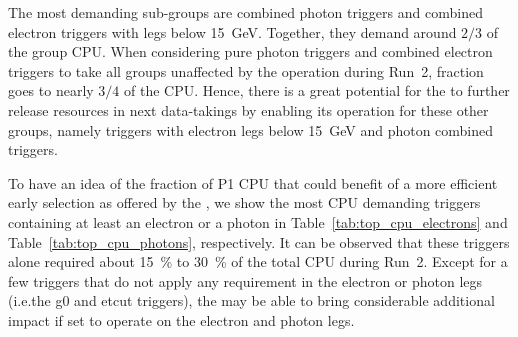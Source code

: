 The most demanding \egamma{} sub-groups are combined photon triggers and
combined electron triggers with legs below \SI{15}{\GeV}. Together, they demand
around $2/3$ of the \egamma{} group CPU. When considering pure photon triggers
and combined electron triggers to take all groups unaffected by the \rnn
operation during Run~2, fraction goes to nearly $3/4$ of the \egamma{} CPU.\@
Hence, there is a great potential for the \rnn{} to further release resources in
next data-takings by enabling its operation for these other groups, namely
triggers with electron legs below \SI{15}{\GeV} and photon combined triggers.

To have an idea of the fraction of P1 CPU that could benefit of a
more efficient early selection as offered by the \rnn{}, we show the most CPU
demanding triggers containing at least an electron or a photon in
Table~\ref{tab:top_cpu_electrons} and Table~\ref{tab:top_cpu_photons},
respectively. It can be observed that these triggers alone required about
\SI{15}{\%} to \SI{30}{\%} of the total CPU during Run~2. Except for a few
triggers that do not apply any requirement in the electron or photon legs
(i.e.\@ the g0 and etcut triggers), the \rnn{} may be able to bring considerable
additional impact if set to operate on the electron and photon legs.


\FloatBarrier




